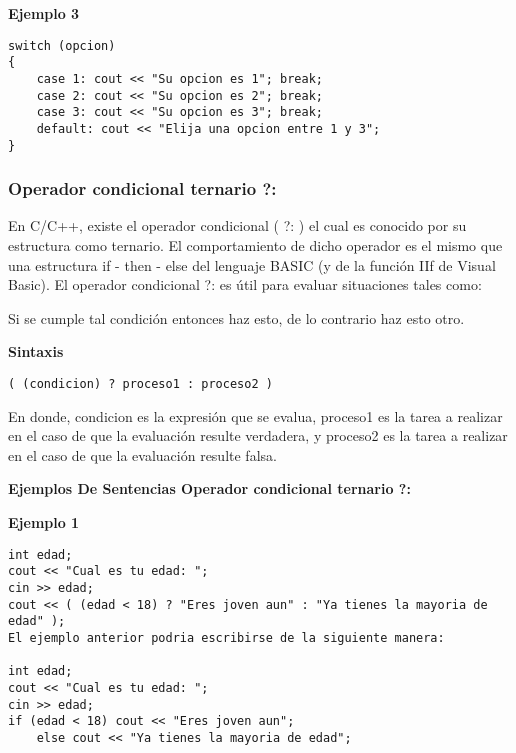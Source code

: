 \textbf{Ejemplo 3}

\begin{lstlisting}[style=Cpp, label=switch-ejemplo-3, caption=Switch Ejemplo 3]
switch (opcion)
{
    case 1: cout << "Su opcion es 1"; break;
    case 2: cout << "Su opcion es 2"; break;
    case 3: cout << "Su opcion es 3"; break;
    default: cout << "Elija una opcion entre 1 y 3";
}
\end{lstlisting}


\subsubsection{Operador condicional ternario ?:}

En C/C++, existe el operador condicional ( ?: ) el cual es conocido por su estructura como ternario. El comportamiento de dicho operador es el mismo que una estructura if - then - else del lenguaje BASIC (y de la función IIf de Visual Basic). El operador condicional ?: es útil para evaluar situaciones tales como:

Si se cumple tal condición entonces haz esto, de lo contrario haz esto otro.

\begin{center}
	\textbf{Sintaxis}
\end{center}

\begin{lstlisting}[style=Cpp, label=sintaxis-switch, caption=Sintaxis Switch]
( (condicion) ? proceso1 : proceso2 )
\end{lstlisting}

En donde, condicion es la expresión que se evalua, proceso1 es la tarea a realizar en el caso de que la evaluación resulte verdadera, y proceso2 es la tarea a realizar en el caso de que la evaluación resulte falsa.

\begin{center}
	\textbf{Ejemplos De Sentencias Operador condicional ternario ?:}
\end{center}

\textbf{Ejemplo 1}

\begin{lstlisting}[style=Cpp, label=condicional-ejemplo-1, caption=Condicional Ejemplo 1]
int edad;
cout << "Cual es tu edad: ";
cin >> edad;
cout << ( (edad < 18) ? "Eres joven aun" : "Ya tienes la mayoria de edad" );
El ejemplo anterior podria escribirse de la siguiente manera:

int edad;
cout << "Cual es tu edad: ";
cin >> edad;
if (edad < 18) cout << "Eres joven aun";
    else cout << "Ya tienes la mayoria de edad";
\end{lstlisting}

